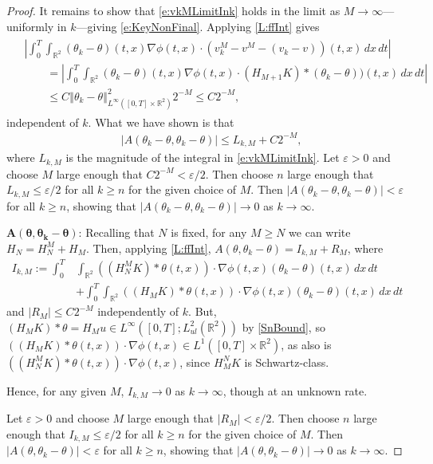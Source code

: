 \documentclass[11pt,reqno,xcolor=svgnames]{amsart}
\def\R{{\mathbb R}}
\theoremstyle{plain}
\theoremstyle{definition}
\theoremstyle{plain}
\theoremstyle{remark}
\newcommand{\abs}[1]{\left\vert#1\right\vert}
\newcommand{\iny}{\ensuremath{\infty}}
\newcommand{\grad}{\ensuremath{\nabla}}
\newcommand{\norm}[1]{\ensuremath{\left\Vert #1 \right\Vert}}
\newcommand{\eps}{\ensuremath{\varepsilon}}
\begin{document}
\begin{proof}
	It remains to show that \cref{e:vkMLimitInk} holds in the limit
	as $M \to \iny$---uniformly in $k$---giving \cref{e:KeyNonFinal}.
	Applying \cref{L:ffInt}
	gives
	\begin{align}\label{e:vkMLimitInM}
		\begin{split}
		&\abs{\int_0^T \int_{\R^2}
        	(\theta_k - \theta)(t, x)
            \grad \phi(t,x) \cdot (v_k^M - v^M
            		- (v_k - v))(t, x)
                \, dx \, dt} \\
			&\qquad
			= \abs{\int_0^T \int_{\R^2}
	        	(\theta_k - \theta)(t, x)
    	        \grad  \phi(t,x) \cdot (H_{M + 1} K) *
	        		(\theta_k - \theta))(t, x)
            	    \, dx \, dt} \\
			&\qquad
			\le C \norm{\theta_k - \theta}_
					{L^\iny([0, T] \times \R^2)}^2
				2^{-M}
			\le C 2^{-M},
		\end{split}
	\end{align}
    independent of $k$.
	What we have shown is that
	\begin{align*}
		&\abs{A(\theta_k - \theta, \theta_k - \theta)}
            \le L_{k, M} + C 2^{-M},
	\end{align*}
	where $L_{k, M}$ is the magnitude of the integral in \cref{e:vkMLimitInk}.
    Let $\eps > 0$
	and choose $M$ large enough that $C 2^{-M} < \eps/2$.
	Then choose $n$ large enough that $L_{k, M}  \le \eps/2$ for all
	$k \ge n$ for the given choice of $M$. Then
	$\abs{A(\theta_k - \theta, \theta_k - \theta)} < \eps$ for all $k \ge n$,
	showing that $\abs{A(\theta_k - \theta, \theta_k - \theta)} \to 0$
	as $k \to \iny$.

    \medskip\noindent$\boldsymbol{A(\theta, \theta_k - \theta)}$:
    Recalling that $N$ is fixed, for any $M \ge N$ we can write $H_N = H_N^M + H_M$. Then, applying \cref{L:ffInt}, $A(\theta, \theta_k - \theta) = I_{k, M} + R_M$, where
    \begin{align*}
        I_{k, M}
			:= \int_0^T &\int_{\R^2} ((H_N^M K) * \theta(t, x))  \cdot \grad \phi(t,x)
                     (\theta_k - \theta)(t, x)  \, dx \, dt \\
            &+ \int_0^T \int_{\R^2} ((H_M K) * \theta(t, x))  \cdot \grad \phi(t,x)
                     (\theta_k - \theta)(t, x)  \, dx \, dt
    \end{align*}
    and $\abs{R_M} \le C 2^{-M}$ independently of $k$.
    But, $(H_M K) * \theta = H_M u \in L^{\infty}([0,T];L^2_{ul}(\R^2))$ by \cref{SnBound}, so $((H_M K) * \theta(t, x))  \cdot \grad \phi(t,x) \in L^1([0,T]\times\R^2)$, as also is $((H_N^M K) * \theta(t, x))  \cdot \grad \phi(t,x)$, since $H_M^N K$ is Schwartz-class.
    
    Hence, for any given $M$, $I_{k, M} \to 0$ as $k \to \iny$, though at an unknown rate.
    
    Let $\eps > 0$ and choose $M$ large enough that $\abs{R_M} < \eps/2$.
	Then choose $n$ large enough that $I_{k, M} \le \eps/2$ for all
	$k \ge n$ for the given choice of $M$. Then
	$\abs{A(\theta, \theta_k - \theta)} < \eps$ for all $k \ge n$,
	showing that $\abs{A(\theta, \theta_k - \theta)} \to 0$
	as $k \to \iny$. 
\end{proof}
\end{document}
